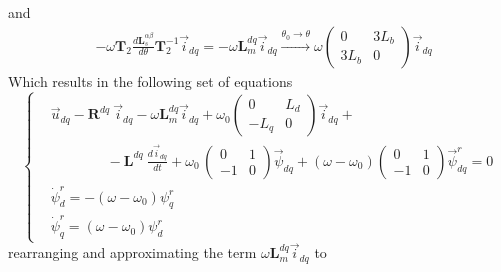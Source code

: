 \documentclass[12pt,a4paper]{scrartcl}
\begin{document}
\begin{onehalfspace}
\begin{equation}
\end{equation}
and
\begin{equation}
	\begin{aligned}
		&-\omega\mathbf{T}_2\frac{d\mathbf{L}_s^{\alpha\beta}}{d\theta}\mathbf{T}_2^{-1}\vec{i}_{dq} = -\omega\mathbf{L}_m^{dq}\vec{i}_{dq}
		\xrightarrow{\theta_0\rightarrow\theta} \omega\begin{pmatrix} 0 & 3L_b\\ 3L_b & 0 \end{pmatrix}\vec{i}_{dq}\		
	\end{aligned}
\end{equation}
Which results in the following set of equations
\begin{equation*}
	\left\lbrace \begin{aligned}
		& \vec{u}_{dq}-\mathbf{R}^{dq}\ \vec{i}_{dq} -\omega\mathbf{L}_m^{dq}\vec{i}_{dq} + \omega_0\begin{pmatrix} 0 & L_d\\ -L_q & 0 \end{pmatrix}\vec{i}_{dq} + \\[6pt] &\qquad\qquad-\mathbf{L}^{dq}\ \frac{d\vec{i}_{dq}}{dt} + \omega_0\,\begin{pmatrix} 0 & 1\\ -1 & 0 \end{pmatrix}\vec{\psi}_{dq} + (\omega - \omega_0)\begin{pmatrix} 0 & 1\\ -1 & 0 \end{pmatrix}\vec{\psi}_{dq}^r = 0\\[6pt]
		& \dot{\psi}_d^r = -\left( \omega-\omega_0\right)\psi_q^r \\[6pt]
		&\dot{\psi}_q^r = \left( \omega-\omega_0\right)\psi_d^r
	\end{aligned} \right. 
\end{equation*}
rearranging and approximating the term $\omega\mathbf{L}_m^{dq}\vec{i}_{dq}$ to 

\end{onehalfspace}
\end{document}
